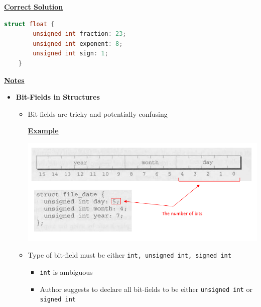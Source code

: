 \documentclass[12pt]{article}
\begin{document}
\begin{enumerate}[1.]
    \begin{mdframed}
    \underline{\textbf{Correct Solution}}

    \bigskip

\begin{lstlisting}[language=c]
    struct float {
        unsigned int fraction: 23;
        unsigned int exponent: 8;
        unsigned int sign: 1;
    }
\end{lstlisting}


    \end{mdframed}

    \bigskip

    \underline{\textbf{Notes}}

    \begin{itemize}
        \item \textbf{Bit-Fields in Structures}

        \begin{itemize}
            \item Bit-fields are tricky and potentially confusing

            \bigskip

            \underline{\textbf{Example}}

            \bigskip

            \begin{center}
            \includegraphics[width=0.9\linewidth]{images/review_9_solution_8.png}
            \end{center}

            \item Type of bit-field must be either \texttt{int, unsigned int, signed int}

            \begin{itemize}
                \item \texttt{int} is ambiguous
                \item Author suggests to declare all bit-fields to be either \texttt{unsigned int}
                or \texttt{signed int}
            \end{itemize}


\end{itemize}
\end{itemize}
\end{enumerate}
\end{document}
